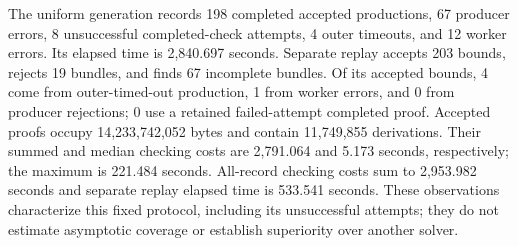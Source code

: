 The uniform generation records 198 completed accepted productions, 67 producer errors, 8 unsuccessful completed-check attempts, 4 outer timeouts, and 12 worker errors. Its elapsed time is 2,840.697 seconds. Separate replay accepts 203 bounds, rejects 19 bundles, and finds 67 incomplete bundles. Of its accepted bounds, 4 come from outer-timed-out production, 1 from worker errors, and 0 from producer rejections; 0 use a retained failed-attempt completed proof. Accepted proofs occupy 14,233,742,052 bytes and contain 11,749,855 derivations. Their summed and median checking costs are 2,791.064 and 5.173 seconds, respectively; the maximum is 221.484 seconds. All-record checking costs sum to 2,953.982 seconds and separate replay elapsed time is 533.541 seconds. These observations characterize this fixed protocol, including its unsuccessful attempts; they do not estimate asymptotic coverage or establish superiority over another solver.
